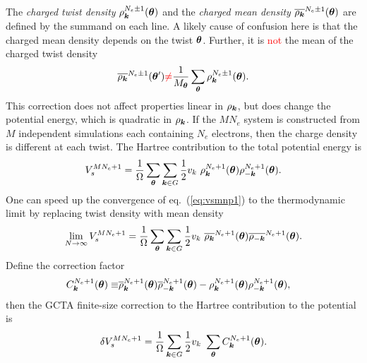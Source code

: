 The \emph{charged twist density} $\rho^{N_e\pm1}_{\boldsymbol{k}}(\boldsymbol{\theta})$ and the \emph{charged mean density} $\overline{\rho_{\boldsymbol{k}}}^{N_e\pm 1}(\boldsymbol{\theta})$ are defined by the summand on each line. A likely cause of confusion here is that the charged mean density depends on the twist $\boldsymbol{\theta}$. Further, it is \textcolor{red}{not} the mean of the charged twist density
\begin{align}
\overline{\rho_{\boldsymbol{k}}}^{N_e\pm 1}(\boldsymbol{\theta}') \textcolor{red}{\neq}
\frac{1}{M_{\boldsymbol{\theta}}}\sum\limits_{\boldsymbol{\theta}}\rho^{N_e\pm1}_{\boldsymbol{k}}(\boldsymbol{\theta}).
\end{align}
This correction does not affect properties linear in $\rho_{\boldsymbol{k}}$, but does change the potential energy, which is quadratic in $\rho_{\boldsymbol{k}}$. If the $MN_e$ system is constructed from $M$ independent simulations each containing $N_e$ electrons, then the charge density is different at each twist. The Hartree contribution to the total potential energy is
\begin{align}\label{eq:vsmnp1}
V_s^{MN_e+1} = \frac{1}{\Omega} \sum\limits_{\boldsymbol{\theta}} \sum\limits_{\boldsymbol{k}\in G}
\frac{1}{2}v_k~
\rho^{N_e+1}_{\boldsymbol{k}}(\boldsymbol{\theta}) \rho^{N_e+1}_{-\boldsymbol{k}}(\boldsymbol{\theta}). 
\end{align}
One can speed up the convergence of eq.~(\ref{eq:vsmnp1}) to the thermodynamic limit by replacing twist density with mean density
\begin{align}
\lim\limits_{N\rightarrow\infty} V_s^{MN_e+1} = \frac{1}{\Omega} \sum\limits_{\boldsymbol{\theta}} \sum\limits_{\boldsymbol{k}\in G}
\frac{1}{2}v_k~
\overline{\rho_{\boldsymbol{k}}}^{N_e+1}(\boldsymbol{\theta}) \overline{\rho_{-\boldsymbol{k}}}^{N_e+1}(\boldsymbol{\theta}).
\end{align}
Define the correction factor
\begin{align}\label{eq:gc-ckt}
C_{\boldsymbol{k}}^{N_e+1}(\boldsymbol{\theta}) \equiv& \overline{\rho}^{N_e+1}_{\boldsymbol{k}}(\boldsymbol{\theta})\overline{\rho}^{N_e+1}_{-\boldsymbol{k}}(\boldsymbol{\theta})
-
\rho^{N_e+1}_{\boldsymbol{k}}(\boldsymbol{\theta})\rho^{N_e+1}_{-\boldsymbol{k}}(\boldsymbol{\theta}),
\end{align}
then the GCTA finite-size correction to the Hartree contribution to the potential is
\begin{align}\label{eq:dvsmnp1}
\delta V_s^{MN_e+1} = \frac{1}{\Omega} \sum\limits_{\boldsymbol{k}\in G}\frac{1}{2}v_k~
\sum\limits_{\boldsymbol{\theta}}
C_{\boldsymbol{k}}^{N_e+1}(\boldsymbol{\theta}).
\end{align}
